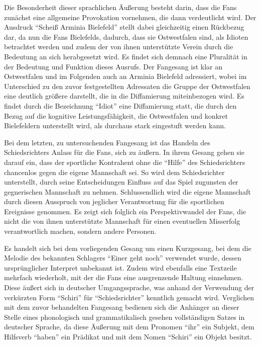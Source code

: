 Die Besonderheit dieser sprachlichen Äußerung besteht darin, dass die Fans zunächst eine allgemeine Provokation vornehmen, die dann verdeutlicht wird.
Der Ausdruck "`Scheiß Arminia Bielefeld"' stellt dabei gleichzeitig einen Rückbezug dar, da nun die Fans Bielefelds, dadurch, dass sie Ostwestfalen sind, als Idioten betrachtet werden und zudem der von ihnen unterstützte Verein durch die Bedeutung an sich herabgesetzt wird.
Es findet sich demnach eine Pluralität in der Bedeutung und Funktion dieses Ausrufs.
Der Fangesang ist klar an Ostwestfalen und im Folgenden auch an Arminia Bielefeld adressiert, wobei im Unterschied zu den zuvor festgestellten Adressaten die Gruppe der Ostwestfalen eine deutlich größere darstellt, die in die Diffamierung miteinbezogen wird.
Es findet durch die Bezeichnung "`Idiot"' eine Diffamierung statt, die durch den Bezug auf die kognitive Leistungsfähigkeit, die Ostwestfalen und konkret Bielefeldern unterstellt wird, als durchaus stark eingestuft werden kann.

Bei dem letzten, zu untersuchenden Fangesang ist das Handeln des Schiedsrichters Anlass für die Fans, sich zu äußern.
In ihrem Gesang gehen sie darauf ein, dass der sportliche Kontrahent ohne die "`Hilfe"' des Schiedsrichters chancenlos gegen die eigene Mannschaft sei\cite{BT14b}.
So wird dem Schiedsrichter unterstellt, durch seine Entscheidungen Einfluss auf das Spiel zugunsten der gegnerischen Mannschaft zu nehmen.
Schlussendlich wird die eigene Mannschaft durch diesen Ausspruch von jeglicher Verantwortung für die sportlichen Ereignisse genommen.
Es zeigt sich folglich ein Perspektivwandel der Fans, die nicht die von ihnen unterstützte Mannschaft für einen eventuellen Misserfolg verantwortlich machen, sondern andere Personen.

Es handelt sich bei dem vorliegenden Gesang um einen Kurzgesang, bei dem die Melodie des bekannten Schlagers "`Einer geht noch"' verwendet wurde, dessen ursprünglicher Interpret unbekannt ist.
Zudem wird ebenfalls eine Textzeile mehrfach wiederholt, mit der die Fans eine ausgrenzende Haltung einnehmen.
Diese äußert sich in deutscher Umgangssprache, was anhand der Verwendung der verkürzten Form "`Schiri"' für "`Schiedsrichter"' kenntlich gemacht wird.
Verglichen mit dem zuvor behandelten Fangesang bedienen sich die Anhänger an dieser Stelle eines phonologisch und grammatikalisch gesehen vollständigen Satzes in deutscher Sprache, da diese Äußerung mit dem Pronomen "`ihr"' ein Subjekt, dem Hilfsverb "`haben"' ein Prädikat und mit dem Nomen "`Schiri"' ein Objekt besitzt.


